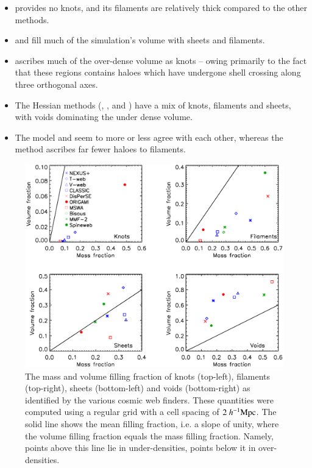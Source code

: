\begin{itemize}
\item \disperse{} provides no knots, and its filaments are relatively thick compared to the other methods.
\item \mmft{} and \spine{} fill much of the simulation's volume with sheets and filaments.
\item \origami{} ascribes much of the over-dense volume as knots -- owing primarily to the fact that these regions contains haloes which have undergone shell crossing along three orthogonal axes.
\item The Hessian methods (\nexus{}, \tweb{}, \vweb{} and \classic{}) have a mix of knots, filaments and sheets, with voids dominating the under dense volume.
\item The \bisous{} model and \mst{} seem to more or less agree with each other, whereas the \fine{} method ascribes far fewer haloes to filaments.
\end{itemize} 

\begin{figure}
 \includegraphics[width=\textwidth]{Chapter3b/FIGS/vff-mff}
 \vspace{-.7cm}
 \caption{ The mass and volume filling fraction of knots (top-left), filaments (top-right), sheets (bottom-left) and voids (bottom-right) as identified by the various cosmic web finders. These quantities were computed using a regular grid with a cell spacing of $2~h^{-1}\rm Mpc$. The solid line shows the mean filling fraction, i.e. a slope of unity, where the volume filling fraction equals the mass filling fraction. Namely, points above this line lie in under-densities, points below it in over-densities. }
 \label{fig:vff_mff}
\end{figure}

